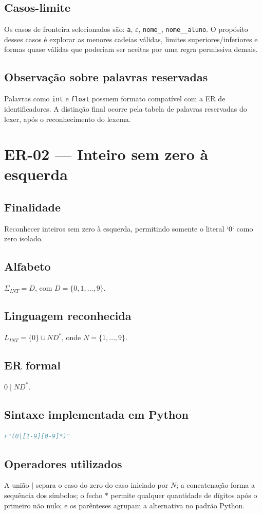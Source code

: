 \documentclass[12pt,a4paper,oneside]{report}
\begin{document}
\subsection{Casos-limite}
Os casos de fronteira selecionados são: \texttt{a}, $\varepsilon$, \texttt{nome\_}, \texttt{nome\_\_aluno}.
\medskip
O propósito desses casos é explorar as menores cadeias válidas, limites superiores/inferiores e formas quase válidas que poderiam ser aceitas por uma regra permissiva demais.
\subsection{Observação sobre palavras reservadas}
Palavras como \texttt{int} e \texttt{float} possuem formato compatível com a ER de identificadores. A distinção final ocorre pela tabela de palavras reservadas do lexer, após o reconhecimento do lexema.

\section{ER-02 --- Inteiro sem zero à esquerda}
\subsection{Finalidade}
Reconhecer inteiros sem zero à esquerda, permitindo somente o literal `0` como zero isolado.
\subsection{Alfabeto}
$\Sigma_{INT}=D$, com $D=\{0,1,\ldots,9\}$.
\subsection{Linguagem reconhecida}
$L_{INT}=\{0\}\cup ND^*$, onde $N=\{1,\ldots,9\}$.
\subsection{ER formal}
$0\mid ND^*$.
\subsection{Sintaxe implementada em Python}
\begin{lstlisting}[language=Python]
r"(0|[1-9][0-9]*)"
\end{lstlisting}
\subsection{Operadores utilizados}
A união $\mid$ separa o caso do zero do caso iniciado por $N$; a concatenação forma a sequência dos símbolos; o fecho $*$ permite qualquer quantidade de dígitos após o primeiro não nulo; e os parênteses agrupam a alternativa no padrão Python.
\end{document}

